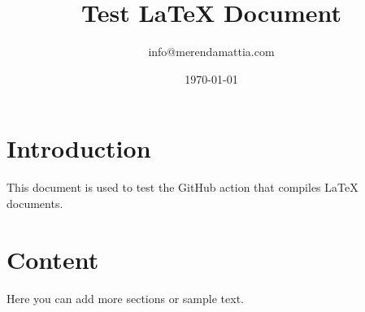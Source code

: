 \documentclass{article}
\title{Test LaTeX Document}
\author{info@merendamattia.com}
\date{\today}
\begin{document}
\maketitle

\section*{Introduction}
This document is used to test the GitHub action that compiles LaTeX documents.

\section*{Content}
Here you can add more sections or sample text.
\end{document}
